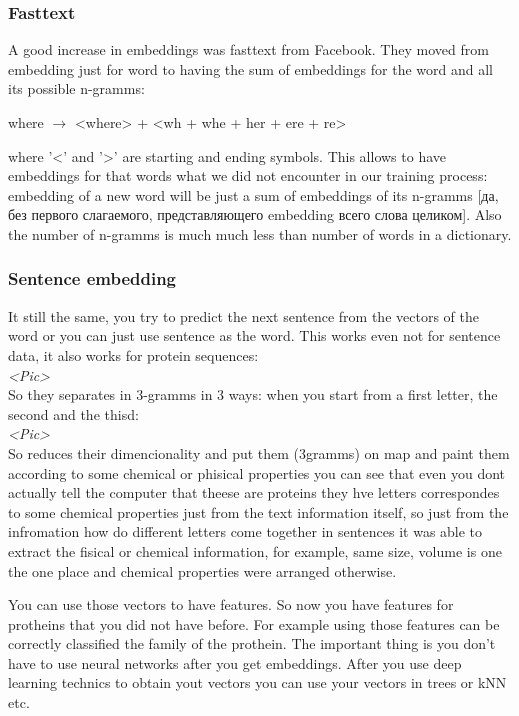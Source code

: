 \subsubsection*{Fasttext}

A good increase in embeddings was fasttext from Facebook. They moved from embedding just for word to having the sum of embeddings for the word and all its possible n-gramms:
\begin{center}
	where $\to$ <where> + <wh + whe + her + ere + re>
\end{center}
where '<' and '>' are starting and ending symbols. This allows to have embeddings for that words what we did not encounter in our training process: embedding of a new word will be just a sum of embeddings of its n-gramms [да, без первого слагаемого, представляющего embedding всего слова целиком]. Also the number of n-gramms is much much less than number of words in a dictionary.

\subsubsection*{Sentence embedding}

It still the same, you try to predict the next sentence from the vectors of the word or you can just use sentence as the word.
This works even not for sentence data, it also works for protein sequences:\\
{\it <Pic>}\\
So they separates in 3-gramms in 3 ways: when you start from a first letter, the second and the thisd:\\
{\it <Pic>}\\
So reduces their dimencionality and put them (3gramms) on map and paint them according to some chemical or phisical properties you can see that even you dont actually tell the computer that theese are proteins they hve letters correspondes to some chemical properties just from the text information itself, so just from the infromation how	do different letters come together in sentences it was able to extract the fisical or chemical information, for example, same size, volume is one the one place and chemical properties were arranged otherwise.

You can use those vectors to have features. So now you have features for protheins that you did not have before. For example using those features can be correctly classified the family of the prothein. The important thing is you don't have to use neural networks after you get embeddings. After you use deep learning technics to obtain yout vectors you can use your vectors in trees or kNN etc.

